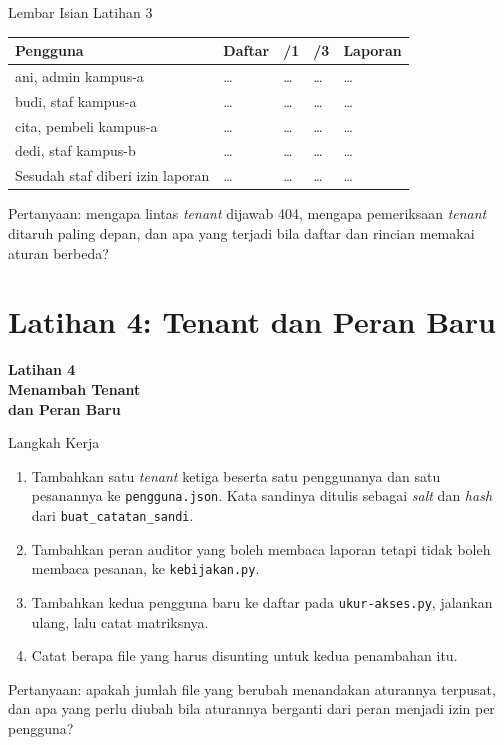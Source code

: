 \documentclass[aspectratio=169, table, 12pt]{beamer}
\begin{document}
\begin{frame}{{\Large Lembar Isian Latihan 3}}
  \vspace{6pt}
  \centering
  {\footnotesize
  \begin{tabularx}{\textwidth}{Yllll}
    \hline
    \textbf{Pengguna} & \textbf{Daftar} & \textbf{/1} & \textbf{/3} & \textbf{Laporan} \\
    \hline
    ani, admin kampus-a & \dots & \dots & \dots & \dots \\
    \hline
    budi, staf kampus-a & \dots & \dots & \dots & \dots \\
    \hline
    cita, pembeli kampus-a & \dots & \dots & \dots & \dots \\
    \hline
    dedi, staf kampus-b & \dots & \dots & \dots & \dots \\
    \hline
    Sesudah staf diberi izin laporan & \dots & \dots & \dots & \dots \\
    \hline
  \end{tabularx}}

  \vspace{6pt}
  {\footnotesize Pertanyaan: mengapa lintas \textit{tenant} dijawab 404,
  mengapa pemeriksaan \textit{tenant} ditaruh paling depan, dan apa yang
  terjadi bila daftar dan rincian memakai aturan berbeda?}
\end{frame}

\section{Latihan 4: Tenant dan Peran Baru}

\begin{frame}{\hfill}
  \centering
  \Huge{\textbf{Latihan 4\\Menambah Tenant\\dan Peran Baru}}
\end{frame}

\begin{frame}{{\Large Langkah Kerja}}
  \vspace{8pt}
  \begin{enumerate}
    \item Tambahkan satu \textit{tenant} ketiga beserta satu penggunanya dan
          satu pesanannya ke \texttt{pengguna.json}. Kata sandinya ditulis
          sebagai \textit{salt} dan \textit{hash} dari
          \texttt{buat\_catatan\_sandi}.
    \item Tambahkan peran auditor yang boleh membaca laporan tetapi tidak
          boleh membaca pesanan, ke \texttt{kebijakan.py}.
    \item Tambahkan kedua pengguna baru ke daftar pada
          \texttt{ukur-akses.py}, jalankan ulang, lalu catat matriksnya.
    \item Catat berapa file yang harus disunting untuk kedua penambahan itu.
  \end{enumerate}
  \vspace{8pt}
  {\small Pertanyaan: apakah jumlah file yang berubah menandakan aturannya
  terpusat, dan apa yang perlu diubah bila aturannya berganti dari peran
  menjadi izin per pengguna?}
\end{frame}
\end{document}
